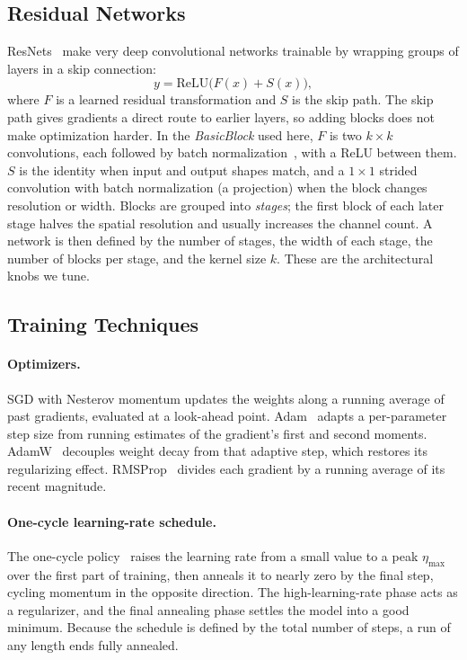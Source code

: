 \documentclass[letterpaper]{article} %
\begin{document}
\subsection{Residual Networks}
ResNets~\citep{he2016resnet} make very deep convolutional networks trainable by wrapping groups of layers in a skip connection:
\begin{equation}
  y = \mathrm{ReLU}\big(F(x) + S(x)\big),
\end{equation}
where $F$ is a learned residual transformation and $S$ is the skip path. The skip path gives gradients a direct route to earlier layers, so adding blocks does not make optimization harder. In the \emph{BasicBlock} used here, $F$ is two $k\times k$ convolutions, each followed by batch normalization~\citep{ioffe2015bn}, with a ReLU between them. $S$ is the identity when input and output shapes match, and a $1\times1$ strided convolution with batch normalization (a projection) when the block changes resolution or width. Blocks are grouped into \emph{stages}; the first block of each later stage halves the spatial resolution and usually increases the channel count. A network is then defined by the number of stages, the width of each stage, the number of blocks per stage, and the kernel size $k$. These are the architectural knobs we tune.

\subsection{Training Techniques}
\paragraph{Optimizers.}
SGD with Nesterov momentum updates the weights along a running average of past gradients, evaluated at a look-ahead point. Adam~\citep{kingma2015adam} adapts a per-parameter step size from running estimates of the gradient's first and second moments. AdamW~\citep{loshchilov2019adamw} decouples weight decay from that adaptive step, which restores its regularizing effect. RMSProp~\citep{tieleman2012rmsprop} divides each gradient by a running average of its recent magnitude.

\paragraph{One-cycle learning-rate schedule.}
The one-cycle policy~\citep{smith2019superconvergence} raises the learning rate from a small value to a peak $\eta_{\max}$ over the first part of training, then anneals it to nearly zero by the final step, cycling momentum in the opposite direction. The high-learning-rate phase acts as a regularizer, and the final annealing phase settles the model into a good minimum. Because the schedule is defined by the total number of steps, a run of any length ends fully annealed.
\end{document}
